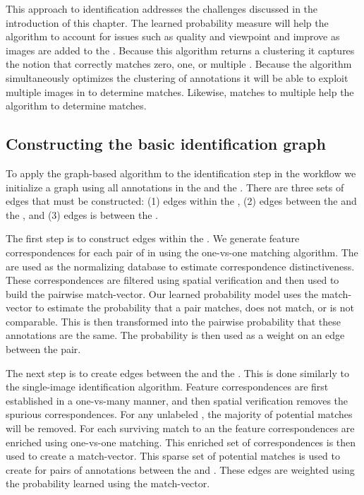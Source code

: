    This approach to identification addresses the challenges discussed in the
      introduction of this chapter.
    The learned probability measure will help the algorithm to account for
      issues such as quality and viewpoint and improve as images are added to
      the \masterdatabase{}.
    Because this algorithm returns a clustering it captures the notion that
      \aan{\encounter{}} correctly matches zero, one, or multiple
      \masterdatabase{} \names{}.
    Because the algorithm simultaneously optimizes the clustering of
      annotations it will be able to exploit multiple images in \encounters{} to
      determine \exemplar{} matches.
    Likewise, matches to multiple \exemplars{} help the algorithm to determine
      \encounter{} matches.


    \subsection{Constructing the basic identification graph}
    To apply the graph-based algorithm to the identification step in the
      workflow we initialize a graph using all annotations in the \occurrence{}
      and the \exemplars{}.
    There are three sets of edges that must be constructed:
    (1) edges within the \uset{},
    (2) edges between the \uset{} and the \lset{}, and
    (3) edges is between the \lset{}.

    The first step is to construct edges within the \uset{}.
    We generate feature correspondences for each pair of \annots{} in
      \aan{\occurrence{}} using the one-vs-one matching algorithm.
    The \exemplars{} are used as the normalizing database to estimate
      correspondence distinctiveness.
    These correspondences are filtered using spatial verification and then
      used to build the pairwise match-vector.
    Our learned probability model uses the match-vector to estimate the
      probability that a pair matches, does not match, or is not comparable.
    This is then transformed into the pairwise probability that these
      annotations are the same.
    The probability is then used as a weight on an edge between the pair.

    The next step is to create edges between the \uset{} and the \lset{}.
    This is done similarly to the single-image identification algorithm.
    Feature correspondences are first established in a one-vs-many manner, and
      then spatial verification removes the spurious correspondences.
    For any unlabeled \annot{}, the majority of potential \exemplar{} matches
      will be removed.
    For each surviving match to an \exemplar{} the feature correspondences are
      enriched using one-vs-one matching.
    This enriched set of correspondences is then used to create a
      match-vector.
    This sparse set of potential matches is used to create for pairs of
      annotations between the \uset{} and \lset{}.
    These edges are weighted using the probability learned using the
      match-vector.

